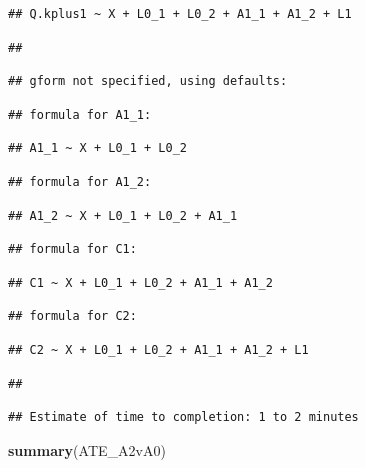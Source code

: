 \documentclass[
]{book}
\newenvironment{Shaded}{\begin{snugshade}}{\end{snugshade}}
\newcommand{\FunctionTok}[1]{\textcolor[rgb]{0.13,0.29,0.53}{\textbf{#1}}}
\newcommand{\NormalTok}[1]{#1}
\begin{document}
\begin{verbatim}
## Q.kplus1 ~ X + L0_1 + L0_2 + A1_1 + A1_2 + L1
\end{verbatim}

\begin{verbatim}
## 
\end{verbatim}

\begin{verbatim}
## gform not specified, using defaults:
\end{verbatim}

\begin{verbatim}
## formula for A1_1:
\end{verbatim}

\begin{verbatim}
## A1_1 ~ X + L0_1 + L0_2
\end{verbatim}

\begin{verbatim}
## formula for A1_2:
\end{verbatim}

\begin{verbatim}
## A1_2 ~ X + L0_1 + L0_2 + A1_1
\end{verbatim}

\begin{verbatim}
## formula for C1:
\end{verbatim}

\begin{verbatim}
## C1 ~ X + L0_1 + L0_2 + A1_1 + A1_2
\end{verbatim}

\begin{verbatim}
## formula for C2:
\end{verbatim}

\begin{verbatim}
## C2 ~ X + L0_1 + L0_2 + A1_1 + A1_2 + L1
\end{verbatim}

\begin{verbatim}
## 
\end{verbatim}

\begin{verbatim}
## Estimate of time to completion: 1 to 2 minutes
\end{verbatim}

\begin{Shaded}
\begin{Highlighting}[]
\FunctionTok{summary}\NormalTok{(ATE\_A2vA0)}
\end{Highlighting}
\end{Shaded}
\end{document}
